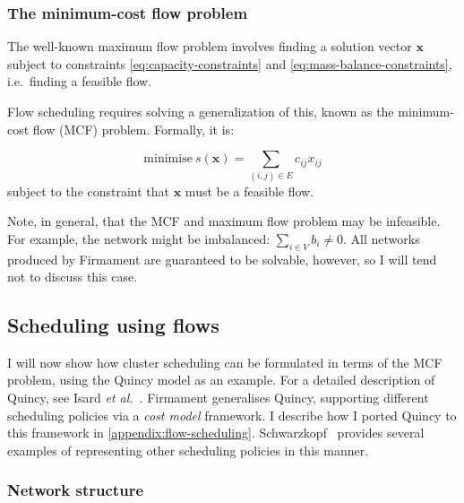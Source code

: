 \subsubsection{The minimum-cost flow problem} \label{sec:prep-flow-mcf}

The well-known maximum flow problem involves finding a solution vector
$\mathbf{x}$ subject to constraints \cref{eq:capacity-constraints} and \cref{eq:mass-balance-constraints}, i.e.\ finding a feasible flow.

Flow scheduling requires solving a generalization of this, known as the minimum-cost flow (MCF) problem. Formally, it is:

\begin{equation} \label{eq:mcf-primal-problem}
\mbox{minimise}\ s(\mathbf{x})=\sum_{(i,j)\in E}c_{ij}x_{ij}
\end{equation}
subject to the constraint that $\mathbf{x}$ must be a feasible flow.

Note, in general, that the MCF and maximum flow problem may be infeasible. For example, the network might be imbalanced: $\sum_{i\in V}b_{i}\neq0$. All networks produced by Firmament are guaranteed to be solvable, however, so I will tend not to discuss this case\footnotemark.

\subsection{Scheduling using flows} \label{sec:prep-flow-scheduling}

I will now show how cluster scheduling can be formulated in terms of the MCF problem, using the Quincy model as an example. For a detailed description of Quincy, see Isard \textit{et al.}~\cite{Isard:2009}. Firmament generalises Quincy, supporting different scheduling policies via a \emph{cost model} framework. I describe how I ported Quincy to this framework in \cref{appendix:flow-scheduling}. Schwarzkopf~\cite[ch.~5]{Schwarzkopf:2015} provides several examples of representing other scheduling policies in this manner.


\subsubsection{Network structure}


